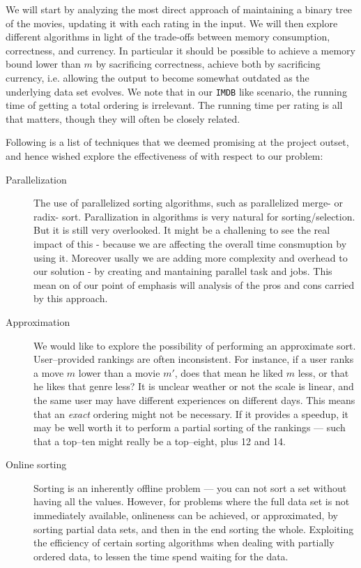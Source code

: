 \documentclass[a4paper, titlepage]{report}
\renewcommand{\%}{\scalebox{.9}{\oldpct}}
\begin{document}
We will start by analyzing the most direct approach of maintaining a binary
tree of the movies, updating it with each rating in the input.
We will then explore different algorithms in light of the trade-offs between
memory consumption, correctness, and currency. In particular it should be
possible to achieve a memory bound lower than $m$ by sacrificing correctness,
achieve both by sacrificing currency, i.e. allowing the output to become
somewhat outdated as the underlying data set evolves. We note that in our
\texttt{IMDB} like scenario, the running time of getting a total ordering is
irrelevant. The running time per rating is all that matters, though they will
often be closely related.

Following is a list of techniques that we deemed promising at the project
outset, and hence wished explore the effectiveness of with respect to our
problem:

\begin{description}
	\item[Parallelization] The use of parallelized sorting algorithms, such
		as parallelized merge- or radix- sort. Parallization in algorithms is very
		natural for sorting/selection. But it is still very overlooked. It might be
		a challening to see the real impact of this - because we are affecting the
		overall time consmuption by using it. Moreover usally we are adding more
		complexity and overhead to our solution - by creating and mantaining parallel
		task and jobs. This mean on of our point of emphasis will analysis of the
		pros and cons carried by this approach.
	\item[Approximation] We would like to explore the possibility of
		performing an approximate sort. User--provided rankings are
		often inconsistent. For instance, if a user ranks a move $m$
		lower than a movie $m'$, does that mean he liked $m$ less, or
		that he likes that genre less? It is unclear weather or not the
		scale is linear, and the same user may have different
		experiences on different days. This means that an \textit{exact}
		ordering might not be necessary. If it provides a speedup, it
		may be well worth it to perform a partial sorting of the
		rankings --- such that a top--ten might really be a top--eight,
		plus 12 and 14.
	\item[Online sorting] Sorting is an inherently offline problem --- you
		can not sort a set without having all the values. However, for
		problems where the full data set is not immediately available,
		onlineness can be achieved, or approximated, by sorting partial
		data sets, and then in the end sorting the whole. Exploiting the
		efficiency of certain sorting algorithms when dealing with
		partially ordered data, to lessen the time spend waiting for the
		data.

\end{description}




\end{document}
